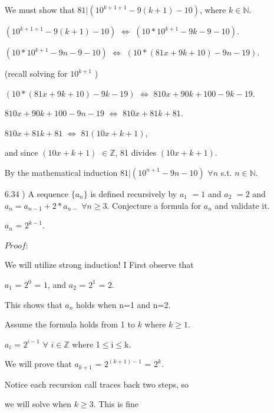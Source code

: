 \documentclass[12pt]{article}
\newcommand{\N}{\mathbb N}
\newcommand{\Z}{\mathbb Z}
\newcommand{\ind}{\hspace{10mm}}
\begin{document}
\begin{enumerate}
		\ind We must show that $ 81 | (10^{k+1+1} -9(k+1) -10)$, where $k \in \N$.
				
		\ind \ind $(10^{k+1+1} -9(k+1) -10)$ $\iff$ $(10*10^{k+1} -9k -9 -10)$. 
		
		\ind \ind $(10*10^{k+1} -9n -9 -10)$ $\iff$ $(10*(81x + 9k + 10) -9n -19)$.
		
		\ind \ind (recall solving for $10^{k+1}$ )
		
		\ind \ind $(10*(81x + 9k + 10) -9k -19)$ $\iff$ $810x + 90k + 100 -9k -19$.		
		
		\ind \ind $810x + 90k + 100 -9n -19$ $\iff$ $810x + 81k + 81$.		
		
		\ind \ind $810x + 81k + 81$ $\iff$ $81(10x + k + 1)$, 
		
		\ind \ind and since $(10x + k + 1)$ $\in \Z$, 81 divides $(10x + k + 1)$.
		
		\ind By the mathematical induction $ 81 | (10^{n+1} -9n -10)$ $\forall n $ s.t. $ n \in \N$. 
		
		\ind \ind \ind \ind \ind \ind 
		{%
			\setlength{\fboxsep}{1pt}%
			\setlength{\fboxrule}{2pt}%
		}%
		
		\item[6.34]) A sequence $\{a_n\}$ is defined recursively by $a_1$ $=1$ and $a_2$ $=2$ and $a_n = a_{n-1}
		+ 2*a_{n-}$ $\forall n \geq 3$. Conjecture a formula for $a_n$ and validate it.
		
		$a_n$ = $2^{k-1}$.		
		
		$Proof : $
		
		\ind We will utilize strong induction! I First observe that
		
		\ind \ind $a_1$ = $2^0$ = $1$, and $a_2$ = $2^1$ = $2$. 
		
		\ind This shows that $a_n$ holds when n=1 and n=2.
		
		\ind Assume the formula holds from 1 to $k$ where $ k \geq 1$. 
		
		\ind $a_i$ = $2^{i-1}$   $\forall$ $i\in\Z$ where 1$\leq$i$\leq$k.
		
		\ind We will prove that $a_{k+1}$ = $2^{(k+1)-1}$ = $2^k$.
		
		\ind Notice each recursion call traces back two steps, so 
		
		\ind \ind we will solve when $k \geq 3$. This is fine
		

\end{enumerate}
\end{document}

